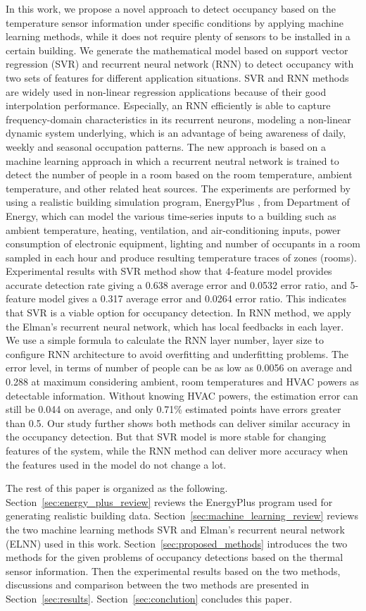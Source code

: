 In this work, we propose a novel approach to detect occupancy based on the
temperature sensor information under specific conditions by applying machine
learning methods, while it does not require plenty of sensors to be installed
in a certain building.  We generate the mathematical model based on support
vector regression (SVR) and recurrent neural network (RNN) to detect occupancy
with two sets of features for different application situations. SVR and RNN
methods are widely used in non-linear regression applications because of their
good interpolation performance. Especially, an RNN efficiently is able to
capture frequency-domain characteristics in its recurrent neurons, modeling a
non-linear dynamic system underlying, which is an advantage of being awareness
of daily, weekly and seasonal occupation patterns.
The new approach is based on a machine
learning approach in which a recurrent neutral network is trained to detect the
number of people in a room based on the room temperature, ambient temperature,
and other related heat sources. The experiments are performed by using a
realistic building simulation program, EnergyPlus \cite{energyplus:2001vf}, from Department of Energy,
which can model the various time-series inputs to a building such as ambient
temperature, heating, ventilation, and air-conditioning inputs, power
consumption of electronic equipment, lighting and number of occupants in a room
sampled in each hour and produce resulting temperature traces of zones (rooms).
Experimental results with SVR method show that 4-feature model provides
accurate detection rate giving a 0.638 average error and 0.0532 error ratio,
and 5-feature model gives a 0.317 average error and 0.0264 error ratio. This
indicates that SVR is a viable option for occupancy detection.  In RNN method,
we apply the Elman's recurrent neural network, which has local feedbacks in
each layer. We use a simple formula to calculate the RNN layer number, layer
size to configure RNN architecture to avoid overfitting and underfitting
problems. The error level, in terms of number of people can be as low as 0.0056
on average and 0.288 at maximum considering ambient, room temperatures and HVAC
powers as detectable information. Without knowing HVAC powers, the estimation
error can still be 0.044 on average, and only 0.71\% estimated points have
errors greater than 0.5. Our study further shows both methods can deliver
similar accuracy in the occupancy detection.  But that SVR model is more stable
for changing features of the system, while the RNN method can deliver more
accuracy when the features used in the model do not change a lot.


The rest of this paper is organized as the following.
Section~\ref{sec:energy_plus_review} reviews the EnergyPlus program used for
generating realistic building data. Section~\ref{sec:machine_learning_review}
reviews the two machine learning methods SVR and Elman's recurrent neural
network (ELNN) used in this work. Section~\ref{sec:proposed_methods} introduces
the two methods for the given problems of occupancy detections based on the
thermal sensor information. Then the experimental results based on the two
methods, discussions and comparison between the two methods are presented in
Section~\ref{sec:results}. Section~\ref{sec:conclution} concludes this paper.
